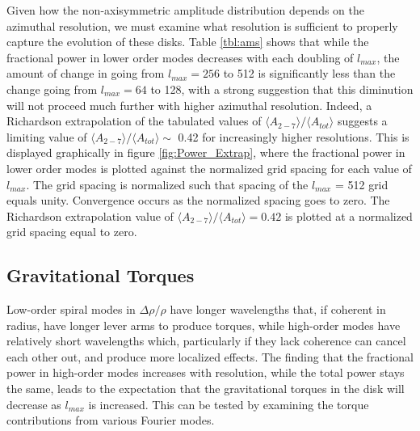 \documentclass[manuscript]{aastex}
\begin{document}
Given how the non-axisymmetric amplitude distribution depends on the azimuthal resolution, we must examine what resolution is sufficient to properly capture the evolution of these disks. Table \ref{tbl:ams} shows that while the fractional power in lower order modes decreases with each doubling of $l_{max}$, the amount of change in going from $l_{max} = 256$ to 512 
is significantly less than the change going from $l_{max} = 64$ to 128, with a strong suggestion that this diminution will not proceed much further with higher azimuthal resolution. Indeed, a  Richardson extrapolation \citep{press1992} of the tabulated values of  $\langle A_{2-7} \rangle / \langle A_{tot} \rangle$ suggests a limiting value of  $\langle A_{2-7} \rangle / \langle A_{tot} \rangle \sim$ 0.42 for increasingly higher resolutions. This is displayed graphically in figure \ref{fig:Power_Extrap}, where the fractional power in lower order modes is plotted against the  normalized grid 
spacing for each value of $l_{max}$. The grid spacing  is normalized such that spacing of the $l_{max}$ = 512 grid
equals unity.  Convergence occurs as the normalized spacing goes to zero. The Richardson extrapolation value  of $\langle A_{2-7}\rangle  / \langle A_{tot}\rangle  = 0.42$ is plotted at a normalized grid spacing  equal to zero. 

\subsection{Gravitational Torques}

Low-order spiral modes in $\Delta\rho / \rho$  have longer wavelengths that, if coherent in radius, have longer lever 
arms to produce torques, while high-order modes have relatively short wavelengths which, particularly if they 
lack coherence can cancel each other out, and produce more localized effects. 
The finding that the fractional power in high-order modes increases
with resolution, while the total power stays the same, leads to
 the expectation that the gravitational torques in the disk will decrease as $l_{max}$ is increased. This can be tested by examining the torque contributions from  various Fourier modes.
\end{document}
